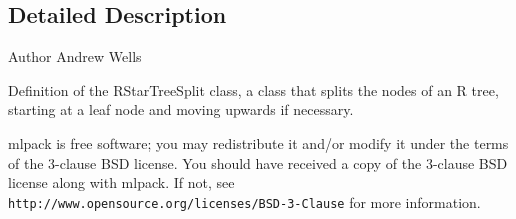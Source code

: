 \subsection{Detailed Description}
\begin{DoxyAuthor}{Author}
Andrew Wells
\end{DoxyAuthor}
Definition of the R\+Star\+Tree\+Split class, a class that splits the nodes of an R tree, starting at a leaf node and moving upwards if necessary.

mlpack is free software; you may redistribute it and/or modify it under the terms of the 3-\/clause B\+SD license. You should have received a copy of the 3-\/clause B\+SD license along with mlpack. If not, see {\tt http\+://www.\+opensource.\+org/licenses/\+B\+S\+D-\/3-\/\+Clause} for more information. 